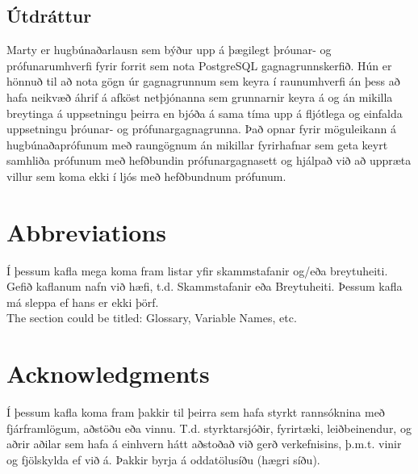 \documentclass[a4paper,12pt,twoside,BCOR=10mm,listof=totoc]{scrbook}
\begin{document}
\section*{\huge Útdráttur}
Marty er hugbúnaðarlausn sem býður upp á þægilegt þróunar- og prófunarumhverfi fyrir forrit sem nota PostgreSQL gagnagrunnskerfið.
Hún er hönnuð til að nota gögn úr gagnagrunnum sem keyra í raunumhverfi án þess að hafa neikvæð áhrif á afköst netþjónanna sem grunnarnir keyra á og án mikilla breytinga á uppsetningu þeirra en bjóða á sama tíma upp á fljótlega og einfalda uppsetningu þróunar- og prófunargagnagrunna.
Það opnar fyrir möguleikann á hugbúnaðaprófunum með raungögnum án mikillar fyrirhafnar sem geta keyrt samhliða prófunum með hefðbundin prófunargagnasett og hjálpað við að uppræta villur sem koma ekki í ljós með hefðbundnum prófunum.
\vfill
\newpage

\tableofcontents
\listoffigures
\listoftables
\lstlistoflistings

\chapter*{Abbreviations}
Í þessum kafla mega koma fram listar yfir skammstafanir og/eða breytuheiti. Gefið kaflanum nafn við hæfi, t.d. Skammstafanir eða Breytuheiti. Þessum kafla má sleppa ef hans er ekki þörf. \\

The section could be titled: Glossary, Variable Names, etc.

\chapter*{Acknowledgments}
Í þessum kafla koma fram þakkir til þeirra sem hafa styrkt rannsóknina með fjárframlögum, aðstöðu eða vinnu. T.d. styrktarsjóðir, fyrirtæki, leiðbeinendur, og aðrir aðilar sem hafa á einhvern hátt aðstoðað við gerð verkefnisins, þ.m.t. vinir og fjölskylda ef við á. Þakkir byrja á oddatölusíðu (hægri síðu).








\appendix
\renewcommand{\chaptername}{Appendix}


\end{document}
